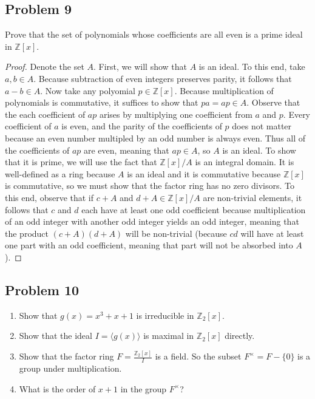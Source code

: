 \documentclass{article}
\begin{document}
\subsection*{Problem 9}
Prove that the set of polynomials whose coefficients are all even is a
prime ideal in $\mathbb{Z}[x]$.
\begin{proof}
	Denote the set $A$. First, we will show that $A$ is an ideal. To this end, take
	$a, b \in A$. Because subtraction of even integers preserves parity, it follows
	that $a - b \in A$. Now take any polyomial $p \in \mathbb{Z}[x]$. Because
	multiplication of polynomials is commutative, it suffices to show that 
	$pa = ap \in A$. Observe that the each coefficient of $ap$ arises by
	multiplying one coefficient from $a$ and $p$. Every coefficient of $a$ is even,
	and the parity of the coefficients of $p$ does not matter because an even number
	multipled by an odd number is always even. Thus all of the coefficients of $ap$ 
	are even, meaning that $ap \in A$, so $A$ is an ideal. To show that it is prime,
	we will use the fact that $\mathbb{Z}[x]/A$ is an integral domain. It is 
	well-defined as a ring because $A$ is an ideal and it is commutative because 
	$\mathbb{Z}[x]$ is commutative, so we must show that the factor ring has no zero 
	divisors. To this end, observe that if $c + A$ and $d + A \in \mathbb{Z}[x]/A$ 
	are non-trivial elements, it follows that $c$ and $d$ each have at least one odd 
	coefficient because multiplication of an odd integer with another odd integer
	yields an odd integer, meaning that the product $(c + A)(d + A)$ will be 
	non-trivial (because $cd$ will have at least one part with an odd coefficient, 
	meaning that part will not be absorbed into $A$).

\end{proof}

\subsection*{Problem 10}
\begin{enumerate}
	\item Show that $g(x) = x^3 + x + 1$ is irreducible in $\mathbb{Z}_2[x]$.
	\item Show that the ideal $I = \langle g(x) \rangle$ is maximal in 
		$\mathbb{Z}_2[x]$ directly.
	\item Show that the factor ring $F = \frac{\mathbb{Z}_2[x]}{I}$ is a field. So 
		the subset $F^\times = F - \{0\}$ is a group under multiplication.
	\item What is the order of $x + 1$ in the group $F^\times$?
\end{enumerate}
\end{document}
